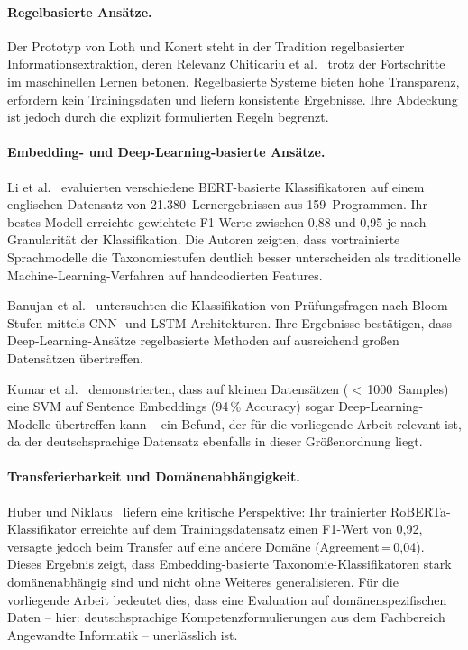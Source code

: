 \paragraph{Regelbasierte Ansätze.}

Der Prototyp von Loth und Konert steht in der Tradition regelbasierter Informationsextraktion, deren Relevanz Chiticariu et al.~\cite{chiticariu2013rulebased} trotz der Fortschritte im maschinellen Lernen betonen.
Regelbasierte Systeme bieten hohe Transparenz, erfordern kein Trainingsdaten und liefern konsistente Ergebnisse.
Ihre Abdeckung ist jedoch durch die explizit formulierten Regeln begrenzt.

\paragraph{Embedding- und Deep-Learning-basierte Ansätze.}

Li et al.~\cite{li2022bloomclassification} evaluierten verschiedene BERT-basierte Klassifikatoren auf einem englischen Datensatz von 21.380~Lernergebnissen aus 159~Programmen.
Ihr bestes Modell erreichte gewichtete F1-Werte zwischen 0{,}88 und 0{,}95 je nach Granularität der Klassifikation.
Die Autoren zeigten, dass vortrainierte Sprachmodelle die Taxonomiestufen deutlich besser unterscheiden als traditionelle Machine-Learning-Verfahren auf handcodierten Features.

Banujan et al.~\cite{banujan2023bloomclassification} untersuchten die Klassifikation von Prüfungsfragen nach Bloom-Stufen mittels CNN- und LSTM-Architekturen.
Ihre Ergebnisse bestätigen, dass Deep-Learning-Ansätze regelbasierte Methoden auf ausreichend großen Datensätzen übertreffen.

Kumar et al.~\cite{kumar2025automated} demonstrierten, dass auf kleinen Datensätzen ($<$\,1000~Samples) eine SVM auf Sentence Embeddings (94\,\% Accuracy) sogar Deep-Learning-Modelle übertreffen kann -- ein Befund, der für die vorliegende Arbeit relevant ist, da der deutschsprachige Datensatz ebenfalls in dieser Größenordnung liegt.

\paragraph{Transferierbarkeit und Domänenabhängigkeit.}

Huber und Niklaus~\cite{huber2025llmsblooms} liefern eine kritische Perspektive: Ihr trainierter RoBERTa-Klassifikator erreichte auf dem Trainingsdatensatz einen F1-Wert von 0{,}92, versagte jedoch beim Transfer auf eine andere Domäne (Agreement\,=\,0{,}04).
Dieses Ergebnis zeigt, dass Embedding-basierte Taxonomie-Klassifikatoren stark domänenabhängig sind und nicht ohne Weiteres generalisieren.
Für die vorliegende Arbeit bedeutet dies, dass eine Evaluation auf domänenspezifischen Daten -- hier: deutschsprachige Kompetenzformulierungen aus dem Fachbereich Angewandte Informatik -- unerlässlich ist.

